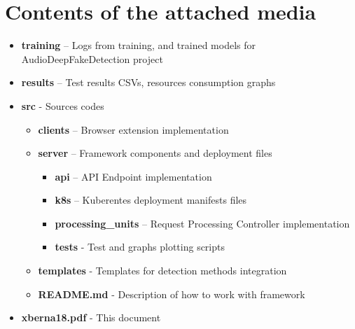 \chapter{Contents of the attached media}

\begin{itemize}
    \item[] \textbf{training} – Logs from training, and trained models for AudioDeepFakeDetection project
    \item[] \textbf{results} – Test results CSVs, resources consumption graphs
    \item[] \textbf{src} - Sources codes
    \begin{itemize}
        \item[] \textbf{clients} – Browser extension implementation
        \item[] \textbf{server} – Framework components and deployment files
        \begin{itemize}
            \item[] \textbf{api} – API Endpoint implementation
            \item[] \textbf{k8s} – Kuberentes deployment manifests files
            \item[] \textbf{processing\_units} – Request Processing Controller implementation
            \item[] \textbf{tests} - Test and graphs plotting scripts        
        \end{itemize}
        \item[] \textbf{templates} - Templates for detection methods integration
        \item[] \textbf{README.md} - Description of how to work with framework
    \end{itemize}
    \item[] \textbf{xberna18.pdf} - This document
\end{itemize}

